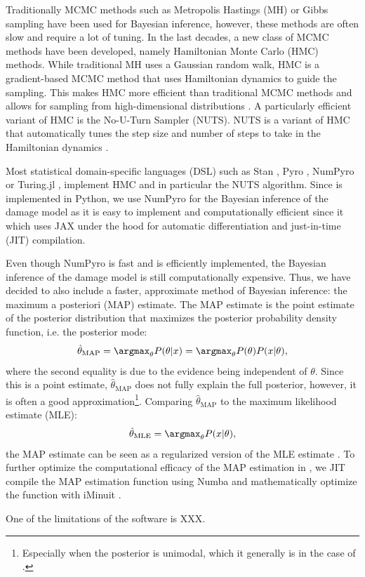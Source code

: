Traditionally MCMC methods such as Metropolis Hastings (MH) or Gibbs sampling have been used for Bayesian inference, however, these methods are often slow and require a lot of tuning. In the last decades, a new class of MCMC methods have been developed, namely Hamiltonian Monte Carlo (HMC) methods. While traditional MH uses a Gaussian random walk, HMC is a gradient-based MCMC method that uses Hamiltonian dynamics to guide the sampling. This makes HMC more efficient than traditional MCMC methods and allows for sampling from high-dimensional distributions \autocite{betancourtConceptualIntroductionHamiltonian2018,nealMCMCUsingHamiltonian2011}. A particularly efficient variant of HMC is the No-U-Turn Sampler (NUTS). NUTS is a variant of HMC that automatically tunes the step size and number of steps to take in the Hamiltonian dynamics \autocite{homanNoUturnSamplerAdaptively2014}.

Most statistical domain-specific languages (DSL) such as Stan \autocite{carpenter2017stan}, Pyro \autocite{bingham2019pyro}, NumPyro \autocite{phanComposableEffectsFlexible2019} or Turing.jl \autocite{geTuringLanguageFlexible2018}, implement HMC and in particular the NUTS algorithm. Since \metaDMG is implemented in Python, we use NumPyro for the Bayesian inference of the damage model as it is easy to implement and computationally efficient since it which uses JAX \autocite{bradburyJAXComposableTransformations2018} under the hood for automatic differentiation and just-in-time (JIT) compilation.

Even though NumPyro is fast and \metaDMG is efficiently implemented, the Bayesian inference of the damage model is still computationally expensive. Thus, we have decided to also include a faster, approximate method of Bayesian inference: the maximum a posteriori (MAP) estimate. The MAP estimate is the point estimate of the posterior distribution that maximizes the posterior probability density function, i.e. the posterior mode:
\begin{align}
    \hat{\theta}_\mathrm{MAP} = \argmax_\theta P(\theta|x) = \argmax_\theta P(\theta)P(x|\theta),
\end{align}
where the second equality is due to the evidence being independent of $\theta$. Since this is a point estimate, $\hat{\theta}_\mathrm{MAP}$ does not fully explain the full posterior, however, it is often a good approximation\footnote{Especially when the posterior is unimodal, which it generally is in the case of \metaDMG.}. Comparing $\hat{\theta}_\mathrm{MAP}$ to the maximum likelihood estimate (MLE):
\begin{align}
    \hat{\theta}_\mathrm{MLE} = \argmax_\theta P(x|\theta),
\end{align}
the MAP estimate can be seen as a regularized version of the MLE estimate \autocite{10.5555/2380985}. To further optimize the computational efficacy of the MAP estimation in \metaDMG, we JIT compile the MAP estimation function using Numba \autocite{lamNumbaLLVMbasedPython2015} and mathematically optimize the function with iMinuit \autocite{dembinskiScikithepIminuitV22021}.

One of the limitations of the \metaDMG software is XXX.
